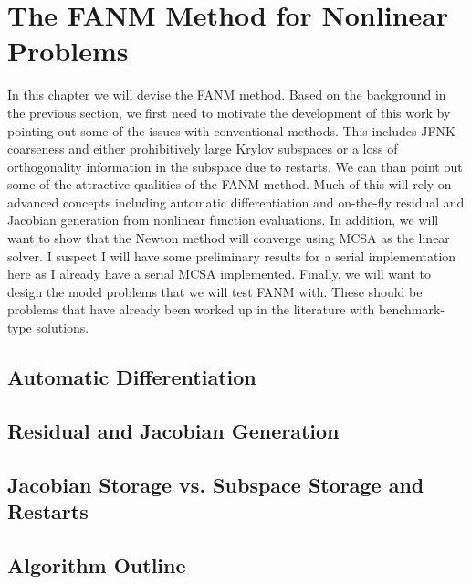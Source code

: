 \chapter{The FANM Method for Nonlinear Problems}
\label{ch:fanm}

In this chapter we will devise the FANM method. Based on the
background in the previous section, we first need to motivate the
development of this work by pointing out some of the issues with
conventional methods. This includes JFNK coarseness and either
prohibitively large Krylov subspaces or a loss of orthogonality
information in the subspace due to restarts. We can than point out
some of the attractive qualities of the FANM method. Much of this will
rely on advanced concepts including automatic differentiation and
on-the-fly residual and Jacobian generation from nonlinear function
evaluations. In addition, we will want to show that the Newton method
will converge using MCSA as the linear solver. I suspect I will have
some preliminary results for a serial implementation here as I already
have a serial MCSA implemented. Finally, we will want to design the
model problems that we will test FANM with. These should be problems
that have already been worked up in the literature with benchmark-type
solutions.

\section{Automatic Differentiation}
\label{sec:automatic_differentiation}

\section{Residual and Jacobian Generation}
\label{sec:fanm_generation}

\section{Jacobian Storage vs. Subspace Storage and Restarts}
\label{sec:fanm_storage}

\section{Algorithm Outline}
\label{sec:fanm_algorithm_outline}

